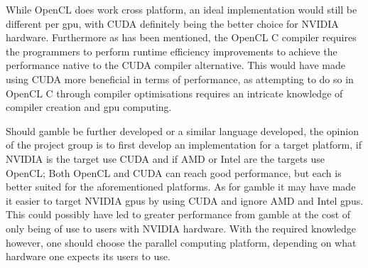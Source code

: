 While OpenCL does work cross platform, an ideal implementation would still be different per \acrshort{gpu}, with CUDA definitely being the better choice for NVIDIA hardware.
Furthermore as has been mentioned, the OpenCL C compiler requires the programmers to perform runtime efficiency improvements to achieve the performance native to the CUDA compiler alternative.
This would have made using CUDA more beneficial in terms of performance, as attempting to do so in OpenCL C through compiler optimisations requires an intricate knowledge of compiler creation and \acrshort{gpu} computing.

Should \gls{gamble} be further developed or a similar language developed, the opinion of the project group is to first develop an implementation for a target platform, if NVIDIA is the target use CUDA and if AMD or Intel are the targets use OpenCL; Both OpenCL and CUDA can reach good performance, but each is better suited for the aforementioned platforms.
As for \gls{gamble} it may have made it easier to target NVIDIA \acrshort{gpu}s by using CUDA and ignore AMD and Intel \acrshort{gpu}s. 
This could possibly have led to greater performance from \acrshort{gamble} at the cost of only being of use to users with NVIDIA hardware.
With the required knowledge however, one should choose the parallel computing platform, depending on what hardware one expects its users to use.
